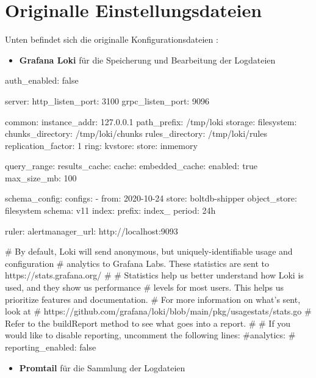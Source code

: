\section{Originalle Einstellungsdateien}\label{appendix:orgGrafana}

Unten befindet sich die originalle Konfigurationsdateien \citep{GrafanaLoki_run}:

\begin{itemize}[noitemsep]
    \item \textbf{Grafana Loki} für die Speicherung und Bearbeitung der Logdateien
\end{itemize}

{
\begin{spverbatim}
    auth_enabled: false

    server:
      http_listen_port: 3100
      grpc_listen_port: 9096
    
    common:
      instance_addr: 127.0.0.1
      path_prefix: /tmp/loki
      storage:
        filesystem:
          chunks_directory: /tmp/loki/chunks
          rules_directory: /tmp/loki/rules
      replication_factor: 1
      ring:
        kvstore:
          store: inmemory
    
    query_range:
      results_cache:
        cache:
          embedded_cache:
            enabled: true
            max_size_mb: 100
    
    schema_config:
      configs:
        - from: 2020-10-24
          store: boltdb-shipper
          object_store: filesystem
          schema: v11
          index:
            prefix: index_
            period: 24h
    
    ruler:
      alertmanager_url: http://localhost:9093
    
    # By default, Loki will send anonymous, but uniquely-identifiable usage and configuration
    # analytics to Grafana Labs. These statistics are sent to https://stats.grafana.org/
    #
    # Statistics help us better understand how Loki is used, and they show us performance
    # levels for most users. This helps us prioritize features and documentation.
    # For more information on what's sent, look at
    # https://github.com/grafana/loki/blob/main/pkg/usagestats/stats.go
    # Refer to the buildReport method to see what goes into a report.
    #
    # If you would like to disable reporting, uncomment the following lines:
    #analytics:
    #  reporting_enabled: false
\end{spverbatim}
}

\begin{itemize}[noitemsep]
    \item \textbf{Promtail} für die Sammlung der Logdateien
\end{itemize}

